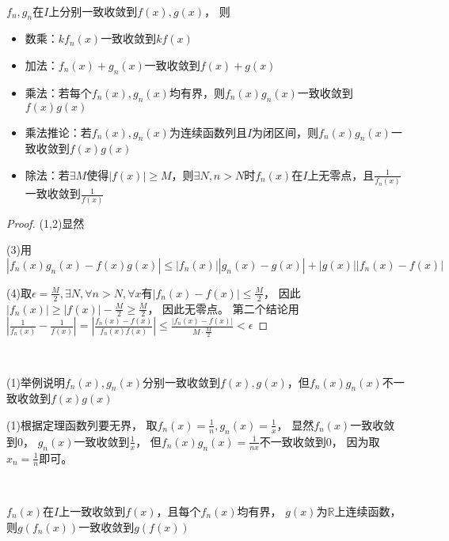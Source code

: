 ~

\begin{theorem}[四则运算]
  $f_n,g_n$在$I$上分别一致收敛到$f(x),g(x)$，
  则
  \begin{itemize}
  \item 数乘：$kf_n(x)$一致收敛到$kf(x)$
  \item 加法：$f_n(x) + g_n(x)$一致收敛到$f(x) + g(x)$
  \item 乘法：若每个$f_n(x),g_n(x)$均有界，则$f_n(x)g_n(x)$一致收敛到$f(x)g(x)$
  \item 乘法推论：若$f_n(x),g_n(x)$为连续函数列且$I$为闭区间，则$f_n(x)g_n(x)$一致收敛到$f(x)g(x)$
  \item 除法：若$\exists M$使得$|f(x)| \geq M$，则$\exists N, n > N$时$f_n(x)$在$I$上无零点，且$\frac{1}{f_n(x)}$一致收敛到$\frac{1}{f(x)}$
  \end{itemize}
\end{theorem}

\begin{proof}
  (1,2)显然

  (3)用$|f_n(x)g_n(x) - f(x)g(x)| \leq |f_n(x)||g_n(x) - g(x)| + |g(x)| |f_n(x) - f(x)|$

  (4)取$\epsilon = \frac{M}{2}, \exists N, \forall n > N, \forall x$有$|f_n(x) - f(x)| \leq \frac{M}{2}$，
  因此$|f_n(x)| \geq |f(x)| - \frac{M}{2} \geq \frac{M}{2}$，
  因此无零点。
  第二个结论用$|\frac{1}{f_n(x)} - \frac{1}{f(x)}| = |\frac{f_n(x) - f(x)}{f_n(x) f(x)}| \leq \frac{|f_n(x) - f(x)|}{M \cdot \frac{M}{2}} < \epsilon$
\end{proof}

~

\begin{exercise}[反例]
  (1)举例说明$f_n(x),g_n(x)$分别一致收敛到$f(x),g(x)$，但$f_n(x)g_n(x)$不一致收敛到$f(x)g(x)$
\end{exercise}

\begin{solution}
  (1)根据定理函数列要无界，
  取$f_n(x) = \frac{1}{n}, g_n(x) = \frac{1}{x}$，
  显然$f_n(x)$一致收敛到$0$，
  $g_n(x)$一致收敛到$\frac{1}{x}$，
  但$f_n(x)g_n(x) = \frac{1}{nx}$不一致收敛到$0$，
  因为取$x_n = \frac{1}{n}$即可。
\end{solution}

~

\begin{theorem}[复合]
  $f_n(x)$在$I$上一致收敛到$f(x)$，且每个$f_n(x)$均有界，
  $g(x)$为$\mathbb{R}$上连续函数，
  则$g(f_n(x))$一致收敛到$g(f(x))$
\end{theorem}

